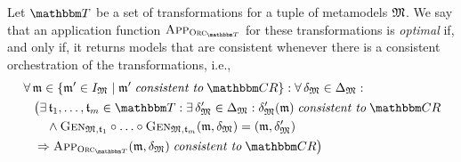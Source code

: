 \begin{definition}
    \label{def:optimalapplicationfunction}
    Let $\transformationset{T}$ be a set of transformations for a tuple of metamodels $\metamodeltuple{M} %
    $.
    We say that an application function $\appfunction{\orcfunction{\transformationset{T}}}$ for these transformations is \emph{optimal} if, and only if, it returns models that are consistent whenever there is a consistent orchestration of the transformations, i.e.,
    \begin{align*}
        &
        \forall \modeltuple{m} \in \setted{\modeltuple{m}' \in \metamodeltupleinstanceset{M} \mid \modeltuple{m}' \consistenttomath \consistencyrelationset{CR}} : \forall \changetuple{\metamodeltuple{M}} %
        \in \changeuniverse{\metamodeltuple{M}} : \\
        & \formulaskip
        \bigl(
            \exists \transformation{t}_{1}, \dots, \transformation{t}_{m} \in \transformationset{T} : 
            \exists \changetuple{\metamodeltuple{M}}' %
            \in \changeuniverse{\metamodeltuple{M}} : \changetuple{\metamodeltuple{M}}'(\modeltuple{m}) \consistenttomath \consistencyrelationset{CR}\\
            & \formulaskip \formulaskip
            \land \generalizationfunction{\metamodeltuple{M}, \transformation{t}_{1}} \concatfunction \dots \concatfunction \generalizationfunction{\metamodeltuple{M}, \transformation{t}_{m}}(\modeltuple{m}, \changetuple{\metamodeltuple{M}}) = (\modeltuple{m}, \changetuple{\metamodeltuple{M}}') %
            \\
            & \formulaskip
            \Rightarrow \appfunction{\orcfunction{\transformationset{T}}}(\modeltuple{m},\changetuple{\metamodeltuple{M}}) \consistenttomath \consistencyrelationset{CR}
        \bigr)
    \end{align*}
\end{definition}

